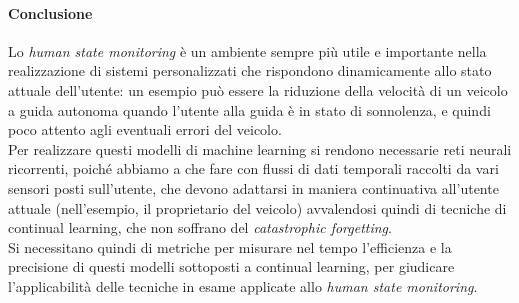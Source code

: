 \paragraph{Conclusione} Lo \textit{human state monitoring} è un ambiente sempre più utile e importante nella realizzazione di sistemi personalizzati che rispondono dinamicamente allo stato attuale dell'utente: un esempio può essere la riduzione della velocità di un veicolo a guida autonoma quando l'utente alla guida è in stato di sonnolenza, e quindi poco attento agli eventuali errori del veicolo.\\
Per realizzare questi modelli di machine learning si rendono necessarie reti neurali ricorrenti, poiché abbiamo a che fare con flussi di dati temporali raccolti da vari sensori posti sull'utente, che devono adattarsi in maniera continuativa all'utente attuale (nell'esempio, il proprietario del veicolo) avvalendosi quindi di tecniche di continual learning, che non soffrano del \textit{catastrophic forgetting}.\\
Si necessitano quindi di metriche per misurare nel tempo l'efficienza e la precisione di questi modelli sottoposti a continual learning, per giudicare l'applicabilità delle tecniche in esame applicate allo \textit{human state monitoring}.